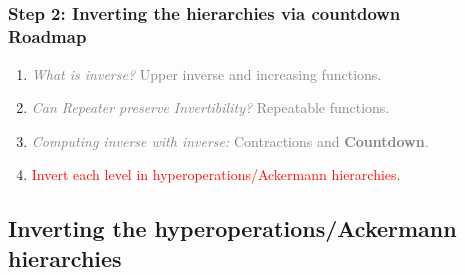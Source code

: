 \subsection*{}
\begin{frame}
\frametitle{Step 2: Inverting the hierarchies via countdown\\ Roadmap}
\begin{enumerate}\itemsep2em
	\item \textcolor<1-2>{gray}{\emph{What is inverse?} Upper inverse and increasing functions.}
	\item \textcolor<1-2>{gray}{\emph{Can Repeater preserve Invertibility?} Repeatable functions.}
	\item \textcolor<1-2>{gray}{\emph{Computing inverse with inverse:} Contractions and \textbf{Countdown}.}
	\item \textcolor<2>{red}{Invert each level in hyperoperations/Ackermann hierarchies.}
\end{enumerate}
\end{frame}


\subsection{Inverting the hyperoperations/Ackermann hierarchies}

